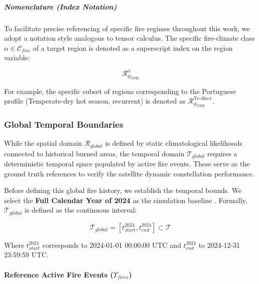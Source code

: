 \begin{table}[ht]
{\subparagraph{Nomenclature (Index Notation)}



To facilitate precise referencing of specific fire regimes throughout this work, we adopt a notation style analogous to tensor calculus. The specific fire-climate class $\alpha \in \mathcal{C}_{fire}$ of a target region is denoted as a superscript index on the region variable:

\begin{equation}

    \mathcal{R}_{\oplus_{FPR}}^{\alpha}

\end{equation}

For example, the specific subset of regions corresponding to the Portuguese profile (Temperate-dry hot season, recurrent) is denoted as $\mathcal{R}_{\oplus_{FPR}}^{\text{Te-dhs-r}}$.



\subsubsection{Global Temporal Boundaries}



While the spatial domain $\mathcal{R}_{global}$ is defined by static climatological likelihoods connected to historical burned areas, the temporal domain $\mathcal{T}_{global}$ requires a deterministic temporal space populated by active fire events. These serve as the ground truth references to verify the satellite dynamic constellation performance.



Before defining this global fire history, we establish the temporal bounds. We select the \textbf{Full Calendar Year of 2024} as the simulation baseline . Formally, $\mathcal{T}_{global}$ is defined as the continuous interval:



\begin{equation}

    \mathcal{T}_{global} = [t_{start}^{2024}, t_{end}^{2024}] \subset \mathcal{T}

\end{equation}

Where $t_{start}^{2024}$ corresponds to 2024-01-01 00:00:00 UTC and $t_{end}^{2024}$ to 2024-12-31 23:59:59 UTC.



\paragraph{Reference Active Fire Events ($\Upsilon_{fires}$)} \hspace{0pt}



}
\end{table}
